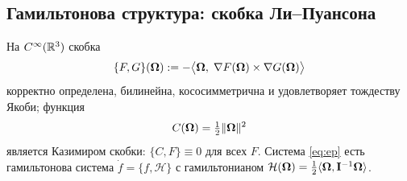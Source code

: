 \subsection{Гамильтонова структура: скобка Ли--Пуансона}

\begin{proposition}\label{prop:poisson}
На $C^\infty(\mathbb{R}^3)$ скобка
\begin{equation}\label{eq:lp}
  \{F,G\}(\boldsymbol{\Omega}) := -\bigl\langle \boldsymbol{\Omega},\; \nabla F(\boldsymbol{\Omega})\times\nabla G(\boldsymbol{\Omega})\bigr\rangle
\end{equation}
корректно определена, билинейна, кососимметрична и удовлетворяет
тождеству Якоби; функция
\[
  C(\boldsymbol{\Omega}) = \tfrac12\|\boldsymbol{\Omega}\|^2
\]
является Казимиром скобки: $\{C,F\} \equiv 0$ для всех $F$. Система
\eqref{eq:ep} есть гамильтонова система $\dot f = \{f,\mathcal H\}$
с гамильтонианом $\mathcal H(\boldsymbol{\Omega}) = \tfrac12\langle\boldsymbol{\Omega},\mathbf{I}^{-1}\boldsymbol{\Omega}\rangle$.
\end{proposition}

